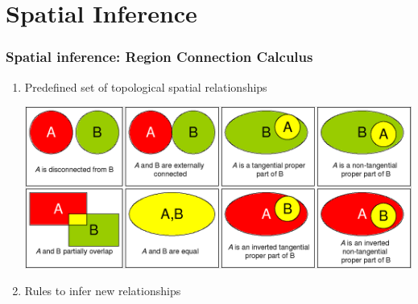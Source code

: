 \documentclass{beamer}
\begin{document}
\section{Spatial Inference}

\frame
{
  \frametitle{Spatial inference: Region Connection Calculus}

  \begin{enumerate}
  \item<+-> Predefined set of topological spatial relationships
    
    \begin{center}
      \includegraphics[scale=0.2]{RCC.png}
    \end{center}
    
  \item<+-> Rules to infer new relationships

\end{enumerate}}
\end{document}
